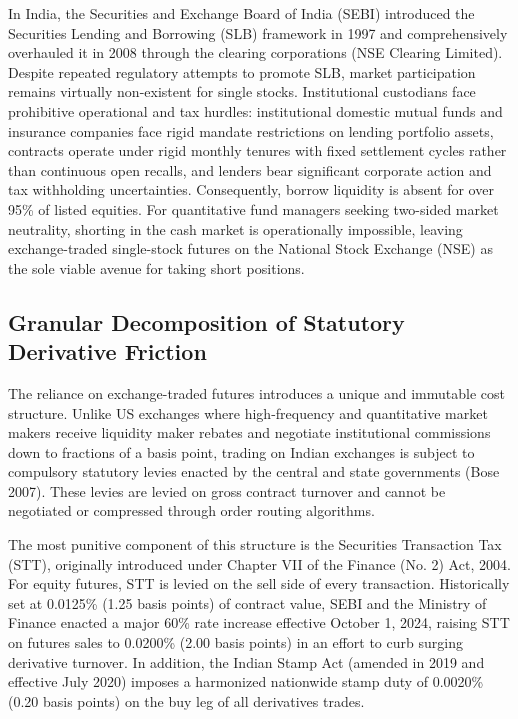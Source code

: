 In India, the Securities and Exchange Board of India (SEBI) introduced the Securities Lending and Borrowing (SLB) framework in 1997 and comprehensively overhauled it in 2008 through the clearing corporations (NSE Clearing Limited). Despite repeated regulatory attempts to promote SLB, market participation remains virtually non-existent for single stocks. Institutional custodians face prohibitive operational and tax hurdles: institutional domestic mutual funds and insurance companies face rigid mandate restrictions on lending portfolio assets, contracts operate under rigid monthly tenures with fixed settlement cycles rather than continuous open recalls, and lenders bear significant corporate action and tax withholding uncertainties. Consequently, borrow liquidity is absent for over 95\% of listed equities. For quantitative fund managers seeking two-sided market neutrality, shorting in the cash market is operationally impossible, leaving exchange-traded single-stock futures on the National Stock Exchange (NSE) as the sole viable avenue for taking short positions.


\subsection{Granular Decomposition of Statutory Derivative Friction}
The reliance on exchange-traded futures introduces a unique and immutable cost structure. Unlike US exchanges where high-frequency and quantitative market makers receive liquidity maker rebates and negotiate institutional commissions down to fractions of a basis point, trading on Indian exchanges is subject to compulsory statutory levies enacted by the central and state governments (Bose 2007). These levies are levied on gross contract turnover and cannot be negotiated or compressed through order routing algorithms.

The most punitive component of this structure is the Securities Transaction Tax (STT), originally introduced under Chapter VII of the Finance (No. 2) Act, 2004. For equity futures, STT is levied on the sell side of every transaction. Historically set at 0.0125\% (1.25 basis points) of contract value, SEBI and the Ministry of Finance enacted a major 60\% rate increase effective October 1, 2024, raising STT on futures sales to 0.0200\% (2.00 basis points) in an effort to curb surging derivative turnover. In addition, the Indian Stamp Act (amended in 2019 and effective July 2020) imposes a harmonized nationwide stamp duty of 0.0020\% (0.20 basis points) on the buy leg of all derivatives trades.

